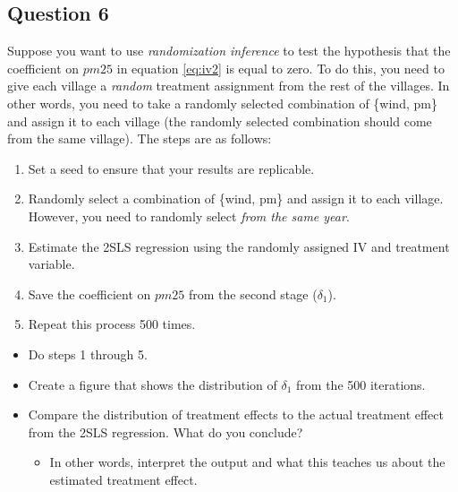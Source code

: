 \documentclass[
]{article}
\providecommand{\tightlist}{%
  \setlength{\itemsep}{0pt}\setlength{\parskip}{0pt}}
\begin{document}
\hypertarget{question-6}{%
\subsection{Question 6}\label{question-6}}

Suppose you want to use \emph{randomization inference} to test the hypothesis that the coefficient on \(pm25\) in equation \eqref{eq:iv2} is equal to zero. To do this, you need to give each village a \emph{random} treatment assignment from the rest of the villages. In other words, you need to take a randomly selected combination of \{wind, pm\} and assign it to each village (the randomly selected combination should come from the same village). The steps are as follows:

\begin{enumerate}
\def\labelenumi{\arabic{enumi}.}
\tightlist
\item
  Set a seed to ensure that your results are replicable.
\item
  Randomly select a combination of \{wind, pm\} and assign it to each village. However, you need to randomly select \emph{from the same year}.
\item
  Estimate the 2SLS regression using the randomly assigned IV and treatment variable.
\item
  Save the coefficient on \(pm25\) from the second stage (\(\delta_1\)).
\item
  Repeat this process 500 times.
\end{enumerate}

\begin{itemize}
\tightlist
\item
  Do steps 1 through 5.
\item
  Create a figure that shows the distribution of \(\delta_1\) from the 500 iterations.
\item
  Compare the distribution of treatment effects to the actual treatment effect from the 2SLS regression. What do you conclude?

  \begin{itemize}
  \tightlist
  \item
    In other words, interpret the output and what this teaches us about the estimated treatment effect.
  \end{itemize}
\end{itemize}
\end{document}
